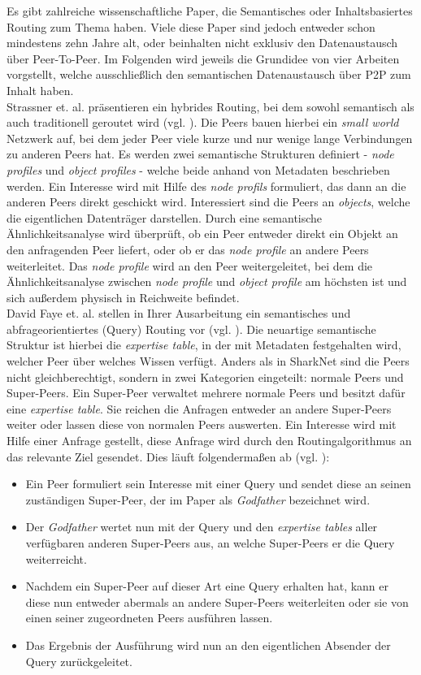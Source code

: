 Es gibt zahlreiche wissenschaftliche Paper, die Semantisches oder Inhaltsbasiertes Routing zum Thema haben. Viele diese Paper sind jedoch entweder schon mindestens zehn Jahre alt, oder beinhalten nicht exklusiv den Datenaustausch über Peer-To-Peer. Im Folgenden wird jeweils die Grundidee von vier Arbeiten vorgstellt, welche ausschließlich den semantischen Datenaustausch über P2P zum Inhalt haben.\\
Strassner et. al. präsentieren ein hybrides Routing, bei dem sowohl semantisch als auch traditionell geroutet wird (vgl. \citet[S. 164ff]{Strassner2010}). Die Peers bauen hierbei ein \textit{small world} Netzwerk auf, bei dem jeder Peer viele kurze und nur wenige lange Verbindungen zu anderen Peers hat. Es werden zwei semantische Strukturen definiert - \textit{node profiles} und \textit{object profiles} - welche beide anhand von Metadaten beschrieben werden. Ein Interesse wird mit Hilfe des \textit{node profils} formuliert, das dann an die anderen Peers direkt geschickt wird. Interessiert sind die Peers an \textit{objects}, welche die eigentlichen Datenträger darstellen. Durch eine semantische Ähnlichkeitsanalyse wird überprüft, ob ein Peer entweder direkt ein Objekt an den anfragenden Peer liefert, oder ob er das \textit{node profile} an andere Peers weiterleitet. Das \textit{node profile} wird an den Peer weitergeleitet, bei dem die Ähnlichkeitsanalyse zwischen \textit{node profile} und \textit{object profile} am höchsten ist und sich außerdem physisch in Reichweite befindet. \\
David Faye et. al. stellen in Ihrer Ausarbeitung ein semantisches und abfrageorientiertes (Query) Routing vor (vgl. \citet[S. 365f]{Faye2007}). Die neuartige semantische Struktur ist hierbei die \textit{expertise table}, in der mit Metadaten festgehalten wird, welcher Peer über welches Wissen verfügt. Anders als in SharkNet sind die Peers nicht gleichberechtigt, sondern in zwei Kategorien eingeteilt: normale Peers und Super-Peers. Ein Super-Peer verwaltet mehrere normale Peers und besitzt dafür eine \textit{expertise table}. Sie reichen die Anfragen entweder an andere Super-Peers weiter oder lassen diese von normalen Peers auswerten. Ein Interesse wird mit Hilfe einer Anfrage gestellt, diese Anfrage wird durch den Routingalgorithmus an das relevante Ziel gesendet. Dies läuft folgendermaßen ab (vgl. \citet[S. 370f]{Faye2007}):
\begin{itemize}
	\item Ein Peer formuliert sein Interesse mit einer Query und sendet diese an seinen zuständigen Super-Peer, der im Paper als \textit{Godfather} bezeichnet wird.
	\item Der \textit{Godfather} wertet nun mit der Query und den \textit{expertise tables} aller verfügbaren anderen Super-Peers aus, an welche Super-Peers er die Query weiterreicht.
	\item Nachdem ein Super-Peer auf dieser Art eine Query erhalten hat, kann er diese nun entweder abermals an andere Super-Peers weiterleiten oder sie von einen seiner zugeordneten Peers ausführen lassen.
	\item Das Ergebnis der Ausführung wird nun an den eigentlichen Absender der Query zurückgeleitet.
\end{itemize}
